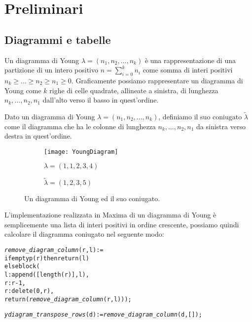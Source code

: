 \chapter{Preliminari}

\section{Diagrammi e tabelle}

\begin{defn}
Un diagramma di Young $\lambda=(n_1,n_2,\dots,n_k)$ \`e una
rappresentazione di una partizione di un intero positivo $n =
\sum_{i=0}^{k}{n_i}$ come somma di interi positivi $n_k \geq \ldots \geq
n_2 \geq n_1 \geq 0$. Graficamente possiamo rappresentare un diagramma di
Young come $k$ righe di celle quadrate, allineate a sinistra, di
lunghezza $n_k,\ldots,n_2,n_1$ dall'alto verso il basso in quest'ordine.
\end{defn}

\begin{defn}
Dato un diagramma di Young $\lambda=(n_1,n_2,\dots,n_k)$, definiamo il
suo coniugato $\tilde{\lambda}$ come il diagramma che ha le colonne di
lunghezza $n_k,\ldots,n_2,n_1$ da sinistra verso destra in quest'ordine.  
\end{defn}

\begin{figure}[h]
\centering

\begin{subfigure}[b]{0.4\textwidth}
\centering
\texttt{[image: YoungDiagram]}
\caption{$\lambda=(1,1,2,3,4)$}
\end{subfigure}%
\begin{subfigure}[b]{0.4\textwidth}
\centering
{}
\caption{$\tilde{\lambda}=(1,2,3,5)$}
\end{subfigure}
\caption{Un diagramma di Young ed il suo coniugato.}
\label{fig:transpose_diagram}
\end{figure}

L'implementazione realizzata in Maxima di un diagramma di Young \`e
semplicemente una lista di interi positivi in ordine crescente,
possiamo quindi calcolare il diagramma coniugato nel seguente modo:

\begin{alltt}
\emph{remove\_diagram\_column} (r, l) := 
if emptyp (r) then return (l)
else block (
  l : append ([length (r)], l),
  r : r-1,
  r : delete (0, r),
  return (\emph{remove\_diagram\_column} (r, l)));

\emph{ydiagram\_transpose\_rows} (d) := \emph{remove\_diagram\_column} (d, []);
\end{alltt}

